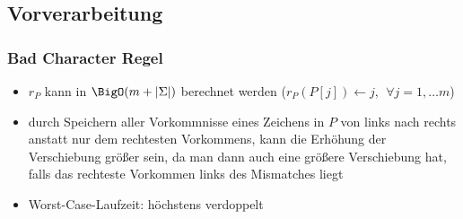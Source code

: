 \subsection{Vorverarbeitung}
\subsubsection*{Bad Character Regel}
\begin{itemize}[itemsep=0pt]
	\item $r_P$ kann in $\BigO(m+|\Sigma|)$ berechnet werden ($r_P(P[j])\leftarrow j,~~\forall j=1,\dots m$)
	\item durch Speichern aller Vorkommnisse eines Zeichens in $P$ von links nach rechts anstatt nur dem rechtesten Vorkommens, kann die Erhöhung der Verschiebung größer sein, da man dann auch eine größere Verschiebung hat, falls das rechteste Vorkommen links des Mismatches liegt
	\item Worst-Case-Laufzeit: höchstens verdoppelt
\end{itemize}

